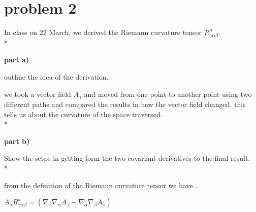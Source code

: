 \documentclass{article}
\begin{document}
\section{problem 2}

\hspace{0.5cm} In class on 22 March, we derived the Riemann curvature tensor $R^{\sigma}_{\gamma\alpha\beta}$.
\\*

\textbf{part a)}

outline the idea of the derivation.

we took a vector field $A_{\gamma}$ and moved from one point to another point using two different paths and compared the results in how the vector field changed. this tells us about the curvature of the space traversed.
\\*

\textbf{part b)}

Show the setps in getting form the two covariant derivatives to the final result.
\\*

from the definition of the Riemann curvature tensor we have...

\begin{center}
$A_{\sigma}R^{\sigma}_{\gamma\alpha\beta}=(\nabla_{\beta}\nabla_{\alpha}A_{\gamma}-\nabla_{\alpha}\nabla_{\beta}A_{\gamma})$
\end{center}
\end{document}

